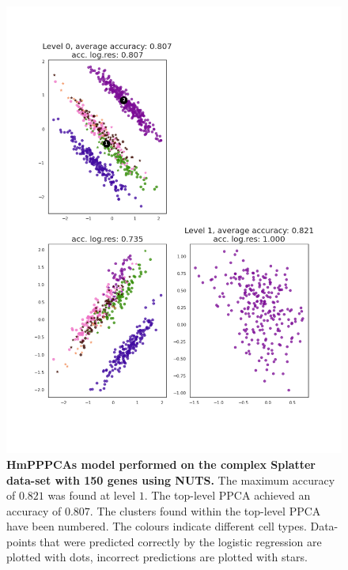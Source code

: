 \begin{figure}
    \centering
    \includegraphics[width=\linewidth]{figs/complex_150_nuts.png}
    \caption[HmPPPCAs model performed on the complex Splatter data-set with 150 genes using NUTS]{\small \textbf{HmPPPCAs model performed on the complex Splatter data-set with 150 genes using NUTS.} \small The maximum accuracy of $0.821$ was found at level $1$. The top-level PPCA achieved an accuracy of $0.807$. The clusters found within the top-level PPCA have been numbered. The colours indicate different cell types. Data-points that were predicted correctly by the logistic regression are plotted with dots, incorrect predictions are plotted with stars.}
    \label{fig:complex_150_nuts}
\end{figure}



